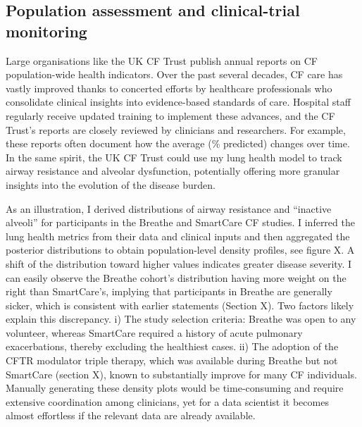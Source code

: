 \subsection{Population assessment and clinical-trial monitoring}
Large organisations like the UK CF Trust publish annual reports on CF population-wide health indicators. Over the past several decades, CF care has vastly improved thanks to concerted efforts by healthcare professionals who consolidate clinical insights into evidence-based standards of care. Hospital staff regularly receive updated training to implement these advances, and the CF Trust’s reports are closely reviewed by clinicians and researchers. For example, these reports often document how the average \F (\% predicted) changes over time. In the same spirit, the UK CF Trust could use my lung health model to track airway resistance and alveolar dysfunction, potentially offering more granular insights into the evolution of the disease burden.

As an illustration, I derived distributions of airway resistance and “inactive alveoli” for participants in the Breathe and SmartCare CF studies. I inferred the lung health metrics from their data and clinical inputs and then aggregated the posterior distributions to obtain population-level density profiles, see figure X. A shift of the distribution toward higher values indicates greater disease severity. I can easily observe the Breathe cohort’s distribution having more weight on the right than SmartCare’s, implying that participants in Breathe are generally sicker, which is consistent with earlier statements (Section X). Two factors likely explain this discrepancy. i) The study selection criteria: Breathe was open to any volunteer, whereas SmartCare required a history of acute pulmonary exacerbations, thereby excluding the healthiest cases. ii) The adoption of the CFTR modulator triple therapy, which was available during Breathe but not SmartCare (section X), known to substantially improve \F for many CF individuals. Manually generating these density plots would be time-consuming and require extensive coordination among clinicians, yet for a data scientist it becomes almost effortless if the relevant data are already available.


